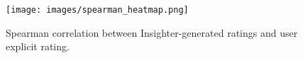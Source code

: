 \begin{figure}[t]
    \centering
    \texttt{[image: images/spearman\_heatmap.png]}
    \vspace{-0.3cm}
    \caption{Spearman correlation between Insighter-generated ratings and user explicit rating. \label{fig:spearman}}
    \vspace{-0.5cm}
\end{figure}